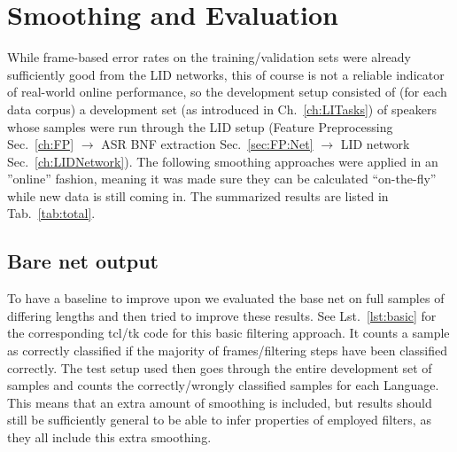 \chapter{Smoothing and Evaluation}
\label{ch:eval}

While frame-based error rates on the training/validation sets were already sufficiently good from the LID networks, this of course is not a reliable indicator of real-world online performance, so the development setup consisted of (for each data corpus) a development set (as introduced in Ch.~\ref{ch:LITasks}) of speakers whose samples were run through the LID setup (Feature Preprocessing Sec.~\ref{ch:FP} $\rightarrow$ ASR BNF extraction Sec.~\ref{sec:FP:Net} $\rightarrow$ LID network Sec.~\ref{ch:LIDNetwork}). The following smoothing approaches were applied in an ''online'' fashion, meaning it was made sure they can be calculated ``on-the-fly'' while new data is still coming in. The summarized results are listed in Tab.~\ref{tab:total}.

\section{Bare net output}
\label{sec:eval:bare}

To have a baseline to improve upon we evaluated the base net on full samples of differing lengths and then tried to improve these results. See Lst.~\ref{lst:basic} for the corresponding tcl/tk code for this basic filtering approach. It counts a sample as correctly classified if the majority of frames/filtering steps have been classified correctly. The test setup used then goes through the entire development set of samples and counts the correctly/wrongly classified samples for each Language. This means that an extra amount of smoothing is included, but results should still be sufficiently general to be able to infer properties of employed filters, as they all include this extra smoothing.

